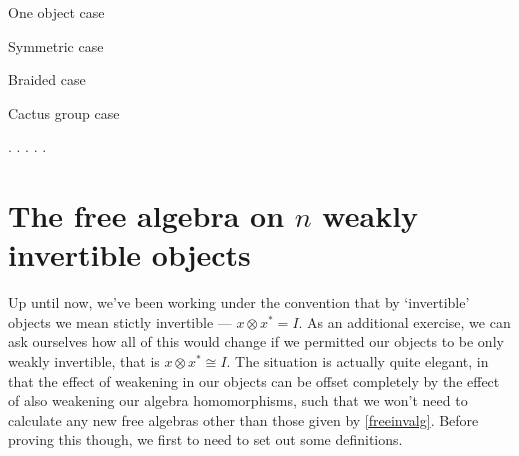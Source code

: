 \begin{prop} One object case
\end{prop}

\begin{prop} Symmetric case
\end{prop}

\begin{prop} Braided case
\end{prop}

\begin{prop} Cactus group case
\end{prop}















.
.
.
.
.


\section{The free algebra on $n$ weakly invertible objects}

Up until now, we've been working under the convention that by `invertible' objects we mean stictly invertible --- $x \otimes x^* = I$. As an additional exercise, we can ask ourselves how all of this would change if we permitted our objects to be only weakly invertible, that is $x \otimes x^* \cong I$. The situation is actually quite elegant, in that the effect of weakening in our objects can be offset completely by the effect of also weakening our algebra homomorphisms, such that we won't need to calculate any new free algebras other than those given by \cref{freeinvalg}. Before proving this though, we first to need to set out some definitions.

